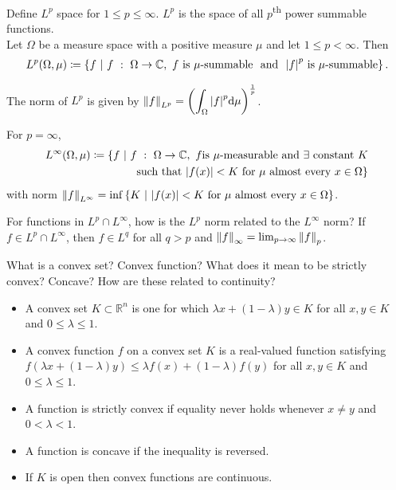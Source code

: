 \documentclass[avery5388,grid,frame]{flashcards}
\newcommand{\f}[3]{#1\ :\ #2 \rightarrow #3}
\def\Rl{\mathbb{R}}
\def\Cx{\mathbb{C}}
\begin{document}


\begin{flashcard}
    {Define $L^p$ space for $1 \leq p \leq \infty$.}
    $L^p$ is the space of all $p$\textsuperscript{th} power summable functions. \\

    Let $\Omega$ be a measure space with a positive measure $\mu$ and let $1 \leq p < \infty$.  Then
    \begin{align*}
        L^p(\Omega,\mu) \coloneqq \left\{f\ |\ \f{f}{\Omega}{\Cx},\ f \text{ is $\mu$-summable}\ \text{ and }\ \abs{f}^p \text{ is $\mu$-summable}\right\}.
    \end{align*}

    The norm of $L^p$ is given by $\displaystyle\norm{f}_{L^p} = \qty(\int_\Omega \abs{f}^p \dd\mu)^\frac{1}{p}$.

    For $p = \infty$,
    \begin{align*}
        L^\infty(\Omega,\mu) \coloneqq \{f\ |\ \f{f}{\Omega}{\Cx},\ f \text{is $\mu$-measurable and } \exists \text{ constant } K \\ \text{ such that } \abs{f(x)} < K \text{ for $\mu$ almost every } x \in \Omega \}
    \end{align*}
    with norm $\displaystyle\norm{f}_{L^\infty} = \inf\left\{K\ |\ \abs{f(x)} < K \text{ for $\mu$ almost every } x \in \Omega\right\}$.
\end{flashcard}

\begin{flashcard}
    {For functions in $L^p \cap L^\infty$, how is the $L^p$ norm related to the $L^\infty$ norm?}
    If $f \in L^p \cap L^\infty$, then $f \in L^q$ for all $q > p$ and $\norm{f}_\infty = \lim_{p \rightarrow \infty}\norm{f}_p$.
\end{flashcard}

\begin{flashcard}
    {What is a convex set?  Convex function?  What does it mean to be strictly convex?  Concave?  How are these related to continuity?}
    \begin{itemize}
        \item A convex set $K \subset \Rl^n$ is one for which $\lambda x + (1 - \lambda)y \in K$ for all $x,y\in K$ and $0\leq\lambda\leq1$.
        \item A convex function $f$ on a convex set $K$ is a real-valued function satisfying $f(\lambda x + (1 - \lambda)y) \leq \lambda f(x) + (1 - \lambda)f(y)$ for all $x,y \in K$ and $0\leq\lambda\leq1$.
        \item A function is strictly convex if equality never holds whenever $x \neq y$ and $0 < \lambda < 1$.
        \item A function is concave if the inequality is reversed.
        \item If $K$ is open then convex functions are continuous.
    \end{itemize}
\end{flashcard}
\end{document}
